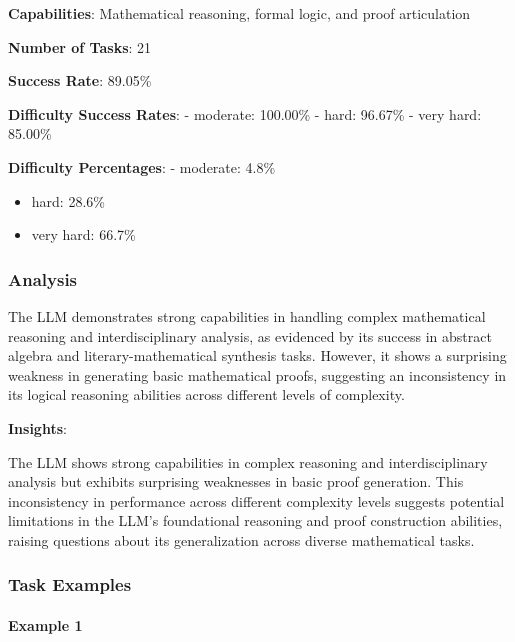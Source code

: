 \documentclass[fleqn,10pt]{wlscirep}
\begin{document}
\textbf{Capabilities}: Mathematical reasoning, formal logic, and proof
articulation

\textbf{Number of Tasks}: 21

\textbf{Success Rate}: 89.05\%

\textbf{Difficulty Success Rates}: - moderate: 100.00\% - hard: 96.67\%
- very hard: 85.00\%

\textbf{Difficulty Percentages}: - moderate: 4.8\%

\begin{itemize}
\item
  hard: 28.6\%
\item
  very hard: 66.7\%
\end{itemize}

\hypertarget{analysis-13}{%
\subsubsection{Analysis}\label{analysis-13}}

The LLM demonstrates strong capabilities in handling complex
mathematical reasoning and interdisciplinary analysis, as evidenced by
its success in abstract algebra and literary-mathematical synthesis
tasks. However, it shows a surprising weakness in generating basic
mathematical proofs, suggesting an inconsistency in its logical
reasoning abilities across different levels of complexity.

\textbf{Insights}:

The LLM shows strong capabilities in complex reasoning and
interdisciplinary analysis but exhibits surprising weaknesses in basic
proof generation. This inconsistency in performance across different
complexity levels suggests potential limitations in the LLM's
foundational reasoning and proof construction abilities, raising
questions about its generalization across diverse mathematical tasks.

\hypertarget{task-examples-13}{%
\subsubsection{Task Examples}\label{task-examples-13}}

\hypertarget{example-1-13}{%
\paragraph{Example 1}\label{example-1-13}}
\end{document}
